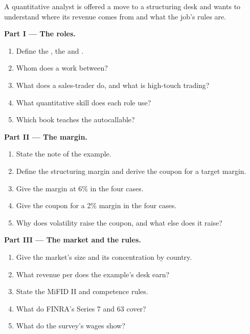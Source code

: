 \begin{problem}\label{pb:in:structurer-sales-and-sales-trader:1}
A quantitative analyst is offered a move to a structuring desk and wants to understand where its revenue comes from and
what the job's rules are.

\medskip\noindent\textbf{Part I --- The roles.}
\begin{enumerate}
\item Define the , the  and .
\item Whom does a  work between?
\item What does a sales-trader do, and what is high-touch trading?
\item What quantitative skill does each role use?
\item Which book teaches the autocallable?
\end{enumerate}

\medskip\noindent\textbf{Part II --- The margin.}
\begin{enumerate}[resume]
\item State the note of the example.
\item Define the structuring margin and derive the coupon for a target margin.
\item Give the margin at 6\% in the four cases.
\item Give the coupon for a 2\% margin in the four cases.
\item Why does volatility raise the coupon, and what else does it raise?
\end{enumerate}

\medskip\noindent\textbf{Part III --- The market and the rules.}
\begin{enumerate}[resume]
\item Give the market's size and its concentration by country.
\item What revenue per  does the example's desk earn?
\item State the MiFID II  and competence rules.
\item What do FINRA's Series 7 and 63 cover?
\item What do the survey's wages show?
\end{enumerate}


\end{problem}
